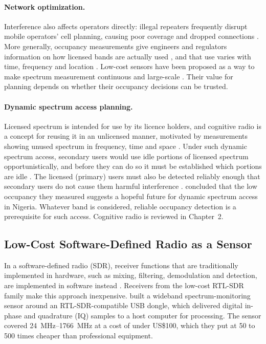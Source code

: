 \paragraph{Network optimization.}
Interference also affects operators directly: illegal repeaters frequently disrupt mobile operators' cell planning, causing poor coverage and dropped connections \parencite{tian2022}. More generally, occupancy measurements give engineers and regulators information on how licensed bands are actually used \parencite[p.~949]{popoola2018}, and that use varies with time, frequency and location \parencite{popoola2018}. Low-cost sensors have been proposed as a way to make spectrum measurement continuous and large-scale \parencite{calvopalomino2015}. Their value for planning depends on whether their occupancy decisions can be trusted.

\paragraph{Dynamic spectrum access planning.}
Licensed spectrum is intended for use by its licence holders, and cognitive radio is a concept for reusing it in an unlicensed manner, motivated by measurements showing unused spectrum in frequency, time and space \parencite{axell2010}. Under such dynamic spectrum access, secondary users would use idle portions of licensed spectrum opportunistically, and before they can do so it must be established which portions are idle \parencite[p.~960]{popoola2018}. The licensed (primary) users must also be detected reliably enough that secondary users do not cause them harmful interference \parencite{tandra2008}. \Textcite{popoola2018} concluded that the low occupancy they measured suggests a hopeful future for dynamic spectrum access in Nigeria. Whatever band is considered, reliable occupancy detection is a prerequisite for such access. Cognitive radio is reviewed in Chapter~2.

\subsection{Low-Cost Software-Defined Radio as a Sensor}
\label{sec:low-cost-sdr}

In a software-defined radio (SDR), receiver functions that are traditionally implemented in hardware, such as mixing, filtering, demodulation and detection, are implemented in software instead \parencite{saber2021}. Receivers from the low-cost RTL-SDR family make this approach inexpensive. \Textcite{calvopalomino2015} built a wideband spectrum-monitoring sensor around an RTL-SDR-compatible USB dongle, which delivered digital in-phase and quadrature (IQ) samples to a host computer for processing. The sensor covered \qtyrange{24}{1766}{\mega\hertz} at a cost of under US\$100, which they put at 50 to 500 times cheaper than professional equipment.

